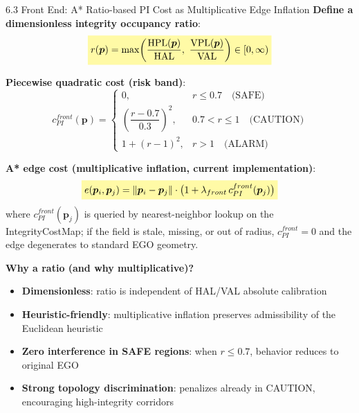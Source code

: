 \documentclass[10pt,aspectratio=169,xcolor=dvipsnames]{beamer}
\newcommand{\HPL}{\mathrm{HPL}}
\newcommand{\VPL}{\mathrm{VPL}}
\newcommand{\HAL}{\mathrm{HAL}}
\newcommand{\VAL}{\mathrm{VAL}}
\newcommand{\1}{\mathbb{1}}
\newcommand{\hlb}[1]{\colorbox{yellow!35}{\(\displaystyle #1\)}}
\newcommand{\innov}[1]{\textcolor{NavyBlue}{\textbf{#1}}}
\begin{document}
\begin{frame}[t]{6.3 Front End: A* Ratio-based PI Cost as Multiplicative Edge Inflation}
  \scriptsize
  \vspace{-2pt}
  \setlength{\abovedisplayskip}{3pt}
  \setlength{\belowdisplayskip}{3pt}
  \textbf{Define a dimensionless integrity occupancy ratio}:
  \[
    \hlb{
      r(\bm{p})=\max\!\left(\frac{\HPL(\bm{p})}{\HAL},\ \frac{\VPL(\bm{p})}{\VAL}\right)\in[0,\infty)
    }
  \]

  \textbf{Piecewise quadratic cost (risk band)}:
  \[
    c_{PI}^{front}(\bm{p})=
    \begin{cases}
      0, & r\le 0.7\quad\text{(SAFE)}\\
      \left(\dfrac{r-0.7}{0.3}\right)^2, & 0.7<r\le 1\quad\text{(CAUTION)}\\
      1+(r-1)^2, & r>1\quad\text{(ALARM)}
    \end{cases}
  \]

  \vspace{1pt}
  \textbf{\innov{A* edge cost (multiplicative inflation, current implementation)}}:
  \[
    \hlb{
      e(\bm{p}_i,\bm{p}_j)=\|\bm{p}_i-\bm{p}_j\|\cdot\bigl(1+\lambda_{front}\,c_{PI}^{front}(\bm{p}_j)\bigr)
    }
  \]
  where $c_{PI}^{front}(\bm{p}_j)$ is queried by nearest-neighbor lookup on the IntegrityCostMap; if the field is stale, missing, or out of radius, $c_{PI}^{front}=0$ and the edge degenerates to standard EGO geometry.

  \vspace{1pt}
  \textbf{Why a ratio (and why multiplicative)?}
  \begin{itemize}\tiny
    \item \textbf{Dimensionless}: ratio is independent of HAL/VAL absolute calibration
    \item \textbf{Heuristic-friendly}: multiplicative inflation preserves admissibility of the Euclidean heuristic
    \item \textbf{Zero interference in SAFE regions}: when $r\le 0.7$, behavior reduces to original EGO
    \item \textbf{Strong topology discrimination}: penalizes already in CAUTION, encouraging high-integrity corridors
  \end{itemize}
\end{frame}
\end{document}

